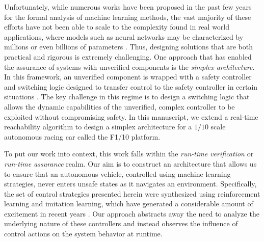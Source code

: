 \documentclass[manuscript,screen,review]{acmart}
\newcommand{\todo}[1]{\textcolor{red}{\textbf{\underline{TODO:}} #1}}
\newcommand{\diego}[1]{\textcolor{purple}{\textbf{\underline{DM:}} #1}}
\begin{document}
Unfortunately, while numerous works have been proposed in the past few years for the formal analysis of machine learning methods, the vast majority of these efforts have not been able to scale to the complexity found in real world applications, where models such as neural networks may be characterized by millions or even billions of parameters \cite{SimonyanVeryDeep}. Thus, designing solutions that are both practical and rigorous is extremely challenging. One approach that has enabled the assurance of systems with unverified components is the \textit{simplex architecture}. In this framework, an unverified component is wrapped with a safety controller and switching logic designed to transfer control to the safety controller in certain situations \cite{Bak2014}. The key challenge in this regime is to design a switching logic that allows the dynamic capabilities of the unverified, complex controller to be exploited without compromising safety. In this manuscript, we extend a real-time reachability algorithm \cite{Bak2014,Johnson2016} to design a simplex architecture for a $1/10$ scale autonomous racing car called the F1/10 platform. %

 To put our work into context, this work falls within the \textit{run-time verification} or \textit{run-time assurance} realm. Our aim is to construct an architecture that allows us to ensure that an autonomous vehicle, controlled using machine learning strategies, never enters unsafe states as it navigates an environment. Specifically, the set of control strategies presented herein were synthesized using reinforcement learning and imitation learning, which have generated a considerable amount of excitement in recent years \cite{bojarski2016end,lillicrap2015continuous}. Our approach abstracts away the need to analyze the underlying nature of these controllers and instead observes the influence of control actions on the system behavior at runtime. %
\end{document}
